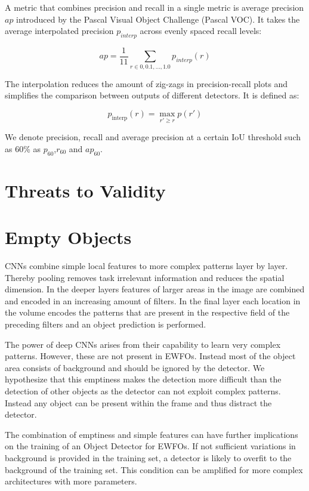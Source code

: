 A metric that combines precision and recall in a single metric is average precision $ap$ introduced by the Pascal Visual Object Challenge (Pascal VOC)\cite{Everingham2010}. It takes the average interpolated precision $p_{interp}$ across evenly spaced recall levels:

$$ ap = \frac{1}{11}\sum_{r \in {0,0.1,...,1.0}}p_{interp}(r)$$

The interpolation reduces the amount of zig-zags in precision-recall plots and simplifies the comparison between outputs of different detectors. It is defined as:

$$ p_\text{interp}(r) = \max\limits_{r' \geq r} p(r')$$

We denote precision, recall and average precision at a certain \ac{IoU} threshold such as 60\% as $p_{60}$,$r_{60}$ and $ap_{60}$.

\section{Threats to Validity}

\section{Empty Objects}
\label{sec:empty}


\acp{CNN} combine simple local features to more complex patterns layer by layer. Thereby pooling removes task irrelevant information and reduces the spatial dimension. In the deeper layers features of larger areas in the image are combined and encoded in an increasing amount of filters. In the final layer each location in the volume encodes the patterns that are present in the respective field of the preceding filters and an object prediction is performed.

The power of deep \acp{CNN} arises from their capability to learn very complex patterns. However, these are not present in \acp{EWFO}. Instead most of the object area consists of background and should be ignored by the detector. We hypothesize that this emptiness makes the detection more difficult than the detection of other objects as the detector can not exploit complex patterns. Instead any object can be present within the frame and thus distract the detector.

The combination of emptiness and simple features can have further implications on the training of an Object Detector for \acp{EWFO}. If not sufficient variations in background is provided in the training set, a detector is likely to overfit to the background of the training set. This condition can be amplified for more complex architectures with more parameters.

